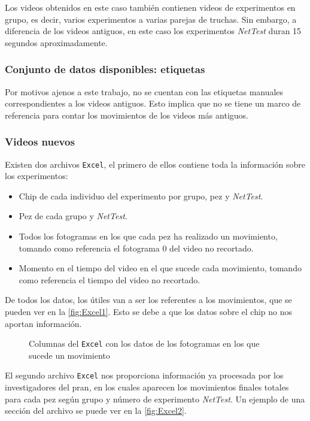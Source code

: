 Los videos obtenidos en este caso también contienen videos de experimentos en grupo, es decir, varios experimentos a varias parejas de truchas. Sin embargo, a diferencia de los videos antiguos, 
en este caso los experimentos \textit{NetTest} duran 15 segundos aproximadamente.

\subsubsection{Conjunto de datos disponibles: etiquetas}

Por motivos ajenos a este trabajo, no se cuentan con las etiquetas manuales correspondientes a los videos antiguos. Esto implica que no se tiene un marco de referencia para 
contar los movimientos de los videos más antiguos.

\subsubsection*{Videos nuevos}

Existen dos archivos \texttt{Excel}, el primero de ellos contiene toda la información sobre los experimentos:
\begin{itemize}
    \item Chip de cada individuo del experimento por grupo, pez y \textit{NetTest}.
    \item Pez de cada grupo y \textit{NetTest}.
    \item Todos los fotogramas en los que cada pez ha realizado un movimiento, tomando como referencia el fotograma 0 del video no recortado.
    \item Momento en el tiempo del video en el que sucede cada movimiento, tomando como referencia el tiempo del video no recortado.
\end{itemize}

De todos los datos, los útiles van a ser los referentes a los movimientos, que se pueden ver en la \autoref{fig:Excel1}. Esto se debe a que los datos sobre el chip no nos aportan información.

\begin{figure}[H]
    \centering
    \caption{Columnas del \texttt{Excel} con los datos de los fotogramas en los que sucede un movimiento}
    \label{fig:Excel1}
\end{figure}
El segundo archivo \texttt{Excel} nos proporciona información ya procesada por los investigadores del \acrshort{pran}, en los cuales aparecen 
los movimientos finales totales para cada pez según grupo y número de experimento \textit{NetTest}. Un ejemplo de una sección del archivo se 
puede ver en la \autoref{fig:Excel2}.


